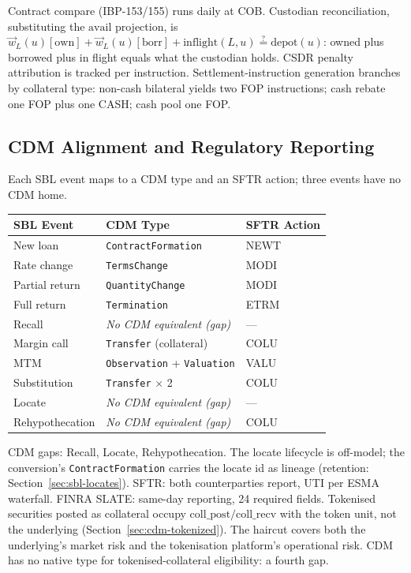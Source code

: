 Contract compare (IBP-153/155) runs daily at COB. Custodian reconciliation, substituting the $\mathrm{avail}$ projection, is $\vec{w}_L(u)[\mathrm{own}] + \vec{w}_L(u)[\mathrm{borr}] + \mathrm{inflight}(L,u) \stackrel{?}{=} \text{depot}(u)$: owned plus borrowed plus in flight equals what the custodian holds. CSDR penalty attribution is tracked per instruction. Settlement-instruction generation branches by collateral type: non-cash bilateral yields two FOP instructions; cash rebate one FOP plus one CASH; cash pool one FOP.

\subsection{CDM Alignment and Regulatory Reporting}
\label{sec:sbl-cdm}

Each SBL event maps to a CDM type and an SFTR action; three events have no CDM home.

\begin{center}
\small
\begin{tabular}{l l l}
\toprule
\textbf{SBL Event} & \textbf{CDM Type} & \textbf{SFTR Action} \\
\midrule
New loan & \texttt{ContractFormation} & NEWT \\
Rate change & \texttt{TermsChange} & MODI \\
Partial return & \texttt{QuantityChange} & MODI \\
Full return & \texttt{Termination} & ETRM \\
Recall & \emph{No CDM equivalent (gap)} & --- \\
Margin call & \texttt{Transfer} (collateral) & COLU \\
MTM & \texttt{Observation} + \texttt{Valuation} & VALU \\
Substitution & \texttt{Transfer} $\times$ 2 & COLU \\
Locate & \emph{No CDM equivalent (gap)} & --- \\
Rehypothecation & \emph{No CDM equivalent (gap)} & COLU \\
\bottomrule
\end{tabular}
\end{center}

CDM gaps: Recall, Locate, Rehypothecation. The locate lifecycle is off-model; the conversion's \texttt{ContractFormation} carries the locate id as lineage (retention: Section~\ref{sec:sbl-locates}). SFTR: both counterparties report, UTI per ESMA waterfall. FINRA SLATE: same-day reporting, 24 required fields. Tokenised securities posted as collateral occupy $\mathrm{coll\_post}/\mathrm{coll\_recv}$ with the token unit, not the underlying (Section~\ref{sec:cdm-tokenized}). The haircut covers both the underlying's market risk and the tokenisation platform's operational risk. CDM has no native type for tokenised-collateral eligibility: a fourth gap.

